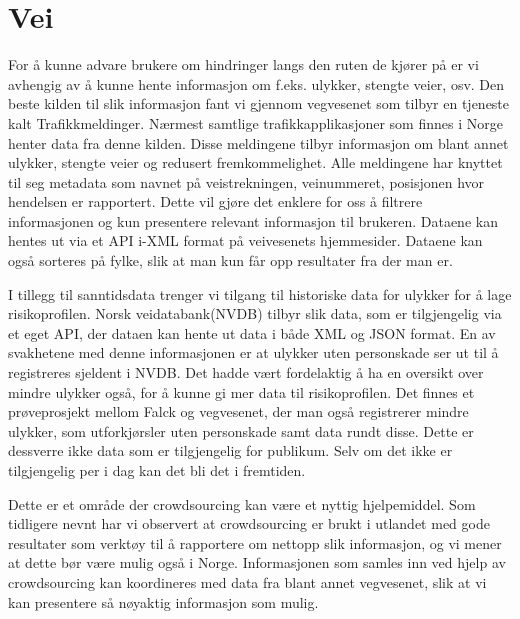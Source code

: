 \documentclass[a4paper,norsk,oneside]{book}
\begin{document}
\section{Vei}
For å kunne advare brukere om hindringer langs den ruten de kjører på er vi avhengig av å kunne hente informasjon om f.eks. ulykker, stengte veier, osv. Den beste kilden til slik informasjon fant vi gjennom vegvesenet som tilbyr en tjeneste kalt Trafikkmeldinger. Nærmest samtlige trafikkapplikasjoner som finnes i Norge henter data fra denne kilden. Disse meldingene tilbyr informasjon om blant annet ulykker, stengte veier og redusert fremkommelighet. Alle meldingene har knyttet til seg metadata som navnet på veistrekningen, veinummeret, posisjonen hvor hendelsen er rapportert. Dette vil gjøre det enklere for oss å filtrere informasjonen og kun presentere relevant informasjon til brukeren. Dataene kan hentes ut via et API i-XML format på veivesenets hjemmesider. Dataene kan også sorteres på fylke, slik at man kun får opp resultater fra der man er.

I tillegg til sanntidsdata trenger vi tilgang til historiske data for ulykker for å lage risikoprofilen. Norsk veidatabank(NVDB) tilbyr slik data, som er tilgjengelig via et eget API, der dataen kan hente ut data i både XML og JSON format.\cite{nve} En av svakhetene med denne informasjonen er at ulykker uten personskade ser ut til å registreres sjeldent i NVDB. Det hadde vært fordelaktig å ha en oversikt over mindre ulykker også, for å kunne gi mer data til risikoprofilen. Det finnes et prøveprosjekt mellom Falck og vegvesenet, der man også registrerer mindre ulykker, som utforkjørsler uten personskade samt data rundt disse. Dette er dessverre ikke data som er tilgjengelig for publikum. Selv om det ikke er tilgjengelig per i dag kan det bli det i fremtiden.

Dette er et område der crowdsourcing kan være et nyttig hjelpemiddel. Som tidligere nevnt har vi observert at crowdsourcing er brukt i utlandet med gode resultater som verktøy til å rapportere om nettopp slik informasjon, og vi mener at dette bør være mulig også i Norge. Informasjonen som samles inn ved hjelp av crowdsourcing kan koordineres med data fra blant annet vegvesenet, slik at vi kan presentere så nøyaktig informasjon som mulig. 
\end{document}

